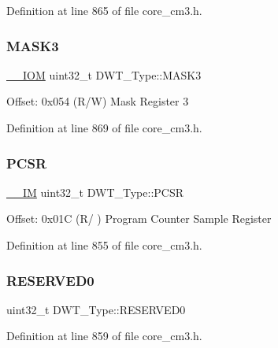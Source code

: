 Definition at line 865 of file core\+\_\+cm3.\+h.

\mbox{\label{struct_d_w_t___type_a2a509d8505c37a3b64f6b24993df5f3f}} 
\subsubsection{\texorpdfstring{M\+A\+S\+K3}{MASK3}}
{\footnotesize\ttfamily \hyperlink{core__sc300_8h_ab6caba5853a60a17e8e04499b52bf691}{\+\_\+\+\_\+\+I\+OM} uint32\+\_\+t D\+W\+T\+\_\+\+Type\+::\+M\+A\+S\+K3}

Offset\+: 0x054 (R/W) Mask Register 3 

Definition at line 869 of file core\+\_\+cm3.\+h.

\mbox{\label{struct_d_w_t___type_a6353ca1d1ad9bc1be05d3b5632960113}} 
\subsubsection{\texorpdfstring{P\+C\+SR}{PCSR}}
{\footnotesize\ttfamily \hyperlink{core__sc300_8h_a4cc1649793116d7c2d8afce7a4ffce43}{\+\_\+\+\_\+\+IM} uint32\+\_\+t D\+W\+T\+\_\+\+Type\+::\+P\+C\+SR}

Offset\+: 0x01C (R/ ) Program Counter Sample Register 

Definition at line 855 of file core\+\_\+cm3.\+h.

\mbox{\label{struct_d_w_t___type_aef6d91fd3df2a013546764fe0e4ad7a8}} 
\subsubsection{\texorpdfstring{R\+E\+S\+E\+R\+V\+E\+D0}{RESERVED0}}
{\footnotesize\ttfamily uint32\+\_\+t D\+W\+T\+\_\+\+Type\+::\+R\+E\+S\+E\+R\+V\+E\+D0}



Definition at line 859 of file core\+\_\+cm3.\+h.

